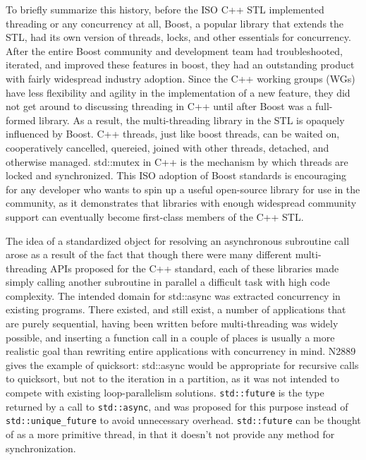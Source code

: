 To briefly summarize this history, before the ISO C++ STL  implemented threading or any concurrency at all, Boost, a popular library that extends the STL, had its own version of threads, locks, and other essentials for concurrency. After the entire Boost community and development team had troubleshooted, iterated, and improved these features in boost, they had an outstanding product with fairly widespread industry adoption. Since the C++ working groups (WGs) have less flexibility and agility in the implementation of a new feature, they did not get around to discussing threading in C++ until after Boost was a full-formed library. As a result, the multi-threading library in the STL is opaquely influenced by Boost. C++ threads, just like boost threads, can be waited on, cooperatively cancelled, quereied, joined with other threads, detached, and otherwise managed. std::mutex in C++ is the mechanism by which threads are locked and synchronized. This ISO adoption of Boost standards is encouraging for any developer who wants to spin up a useful open-source library for use in the community, as it demonstrates that libraries with enough widespread community support can eventually become first-class members of the C++ STL. 

The idea of a standardized object for resolving an asynchronous subroutine call arose as a result of the fact that though there were many different multi-threading APIs proposed for the C++ standard, each of these libraries made simply calling another subroutine in parallel a difficult task with high code complexity. The intended domain for std::async was extracted concurrency in existing programs. There existed, and still exist, a number of applications that are purely sequential, having been written before multi-threading was widely possible, and inserting a function call in a couple of places is usually a more realistic goal than rewriting entire applications with concurrency in mind. N2889 gives the example of quicksort: std::async would be appropriate for recursive calls to quicksort, but not to the iteration in a partition, as it was not intended to compete with existing loop-parallelism solutions. \texttt{std::future} is the type returned by a call to \texttt{std::async}, and was proposed for this purpose instead of \texttt{std::unique\_future} to avoid unnecessary overhead. \texttt{std::future} can be thought of as a more primitive thread, in that it doesn't not provide any method for synchronization. 

